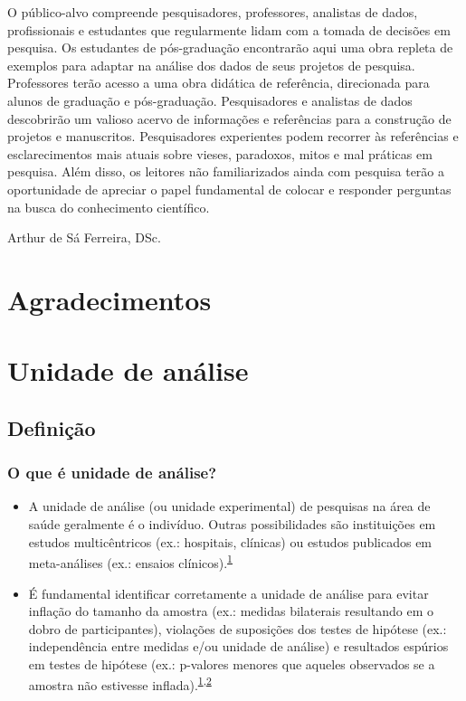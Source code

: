 \documentclass[
]{book}
\begin{document}
O público-alvo compreende pesquisadores, professores, analistas de dados, profissionais e estudantes que regularmente lidam com a tomada de decisões em pesquisa. Os estudantes de pós-graduação encontrarão aqui uma obra repleta de exemplos para adaptar na análise dos dados de seus projetos de pesquisa. Professores terão acesso a uma obra didática de referência, direcionada para alunos de graduação e pós-graduação. Pesquisadores e analistas de dados descobrirão um valioso acervo de informações e referências para a construção de projetos e manuscritos. Pesquisadores experientes podem recorrer às referências e esclarecimentos mais atuais sobre vieses, paradoxos, mitos e mal práticas em pesquisa. Além disso, os leitores não familiarizados ainda com pesquisa terão a oportunidade de apreciar o papel fundamental de colocar e responder perguntas na busca do conhecimento científico.

Arthur de Sá Ferreira, DSc.

\hypertarget{agradecimentos}{%
\chapter*{Agradecimentos}\label{agradecimentos}}

\hypertarget{unidade-analise}{%
\chapter{\texorpdfstring{\textbf{Unidade de análise}}{Unidade de análise}}\label{unidade-analise}}

\hypertarget{definicao}{%
\section{Definição}\label{definicao}}

\hypertarget{o-que-uxe9-unidade-de-anuxe1lise}{%
\subsection{O que é unidade de análise?}\label{o-que-uxe9-unidade-de-anuxe1lise}}

\begin{itemize}
\item
  A unidade de análise (ou unidade experimental) de pesquisas na área de saúde geralmente é o indivíduo. Outras possibilidades são instituições em estudos multicêntricos (ex.: hospitais, clínicas) ou estudos publicados em meta-análises (ex.: ensaios clínicos).\textsuperscript{\protect\hyperlink{ref-Altman1997}{1}}
\item
  É fundamental identificar corretamente a unidade de análise para evitar inflação do tamanho da amostra (ex.: medidas bilaterais resultando em o dobro de participantes), violações de suposições dos testes de hipótese (ex.: independência entre medidas e/ou unidade de análise) e resultados espúrios em testes de hipótese (ex.: p-valores menores que aqueles observados se a amostra não estivesse inflada).\textsuperscript{\protect\hyperlink{ref-Altman1997}{1},\protect\hyperlink{ref-Matthews1990}{2}}
\end{itemize}
\end{document}
